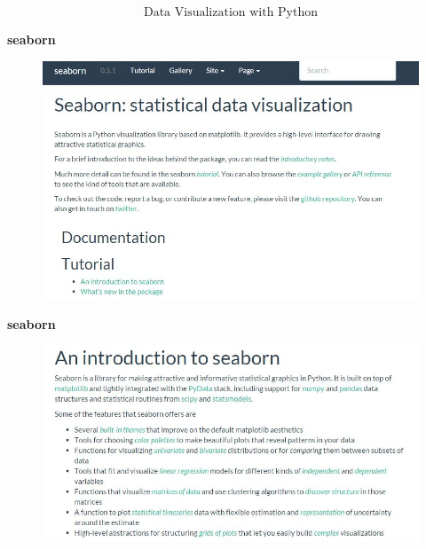 \documentclass[MASTER.tex]{subfiles}
\begin{document}
 

	
	\begin{frame}
		\huge
		\[ \mbox{Data Visualization with Python} \]
	\end{frame}
	
\begin{frame}
	\Large
	\textbf{seaborn}
	
	\begin{figure}
		\centering
		\includegraphics[width=1.05\linewidth]{seabornmain}
		
	\end{figure}
\end{frame}
\begin{frame}
	\Large
	\textbf{seaborn}
	
	\begin{figure}
		\centering
		\includegraphics[width=1.05\linewidth]{seabornsiteinfo}
		
	\end{figure}
\end{frame}
\end{document}
